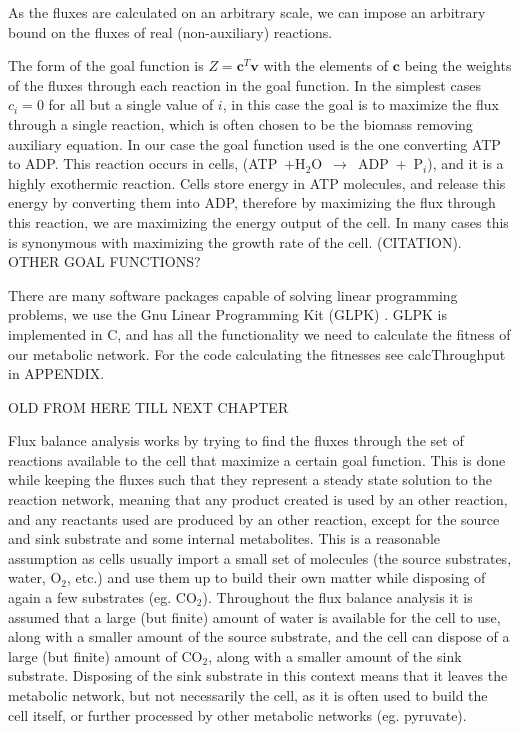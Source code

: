 \documentclass[10pt,a4paper]{article}
\begin{document}
	As the fluxes are calculated on an arbitrary scale, we can impose an arbitrary bound on the fluxes of real (non-auxiliary) reactions.


	The form of the goal function is $Z=\mathbf{c}^T \mathbf{v}$ with the elements of $\mathbf{c}$ being the weights of the fluxes through each reaction in the goal function. In the simplest cases $c_i=0$ for all but a single value of $i$, in this case the goal is to maximize the flux through a single reaction, which is often chosen to be the biomass removing auxiliary equation. In our case the goal function used is the one converting ATP to ADP. This reaction occurs in cells, (ATP~+H$_2$O~$\rightarrow$~ADP~+~P$_i$), and it is a highly exothermic reaction. Cells store energy in ATP molecules, and release this energy by converting them into ADP, therefore by maximizing the flux through this reaction, we are maximizing the energy output of the cell. In many cases this is synonymous with maximizing the growth rate of the cell. (CITATION). OTHER GOAL FUNCTIONS?
	
	There are many software packages capable of solving linear programming problems, we use the Gnu Linear Programming Kit (GLPK) \cite{glpk}. GLPK is implemented in C, and has all the functionality we need to calculate the fitness of our metabolic network. For the code calculating the fitnesses see calcThroughput in APPENDIX.


	OLD FROM HERE TILL NEXT CHAPTER

	
	Flux balance analysis works by trying to find the fluxes through the set of reactions available to the cell that maximize a certain goal function. This is done while keeping the fluxes such that they represent a steady state solution to the reaction network, meaning that any product created is used by an other reaction, and any reactants used are produced by an other reaction, except for the source and sink substrate and some internal metabolites. This is a reasonable assumption as cells usually import a small set of molecules (the source substrates, water, O$_2$, etc.) and use them up to build their own matter while disposing of again a few substrates (eg. CO$_2$). Throughout the flux balance analysis it is assumed that a large (but finite) amount of water is available for the cell to use, along with a smaller amount of the source substrate, and the cell can dispose of a large (but finite) amount of CO$_2$, along with a smaller amount of the sink substrate. Disposing of the sink substrate in this context means that it leaves the metabolic network, but not necessarily the cell, as it is often used to build the cell itself, or further processed by other metabolic networks (eg. pyruvate).
	
\end{document}
